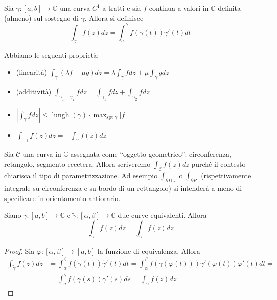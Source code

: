 \begin{definition}
    Sia \(\gamma : [a,b] \to \mathbb{C}\) una curva \(C^{1}\) a tratti e sia
    \(f\) continua a valori in \(\mathbb{C}\) definita (almeno) sul sostegno di
    \(\gamma\). Allora si definisce
    \[
        \int_{\gamma} f(z) dz = \int_{a}^{b} f(\gamma(t)) \gamma'(t) dt
    \]
\end{definition}
Abbiamo le seguenti proprietà:
\begin{itemize}[label = --]
    \item (linearità) \(\displaystyle \int_{\gamma} \left( \lambda f + \mu g
        \right) dz = \lambda \int_{\gamma} f dz + \mu \int_{\gamma} g dz\)
    \item (additività) \(\displaystyle \int_{\gamma_1 + \gamma_2} f dz =
        \int_{\gamma_1} f dz + \int_{\gamma_2} f dz\)
    \item \(\displaystyle \left| \int_{\gamma} f dz \right| \le \text{ lungh
        }(\gamma) \cdot \max_{\text{spt } \gamma } |f|  \) 
    \item \(\displaystyle \int_{-\gamma} f(z) dz = - \int_{\gamma} f(z)dz\) 
\end{itemize}

Sia \(\mathcal{C}\) una curva in \(\mathbb{C}\) assegnata come ``oggetto
geometrico'': circonferenza, retangolo, segmento eccetera. Allora scriveremo
\(
    \int_{\mathcal{C}} f(z) dz
\)
purché il contesto chiarisca il tipo di parametrizzazione. Ad esempio
\(
    \int_{\partial D_R} 
\) o \(
    \int_{\partial R}
\) (rispettivamente integrale su circonferenza e su bordo di un rettangolo) si intenderà a meno di specificare in orientamento antiorario.

\begin{proposition}
    Siano \(\gamma : [a,b] \to \mathbb{C}\) e \(\tilde{\gamma} : [\alpha, \beta]
    \to \mathbb{C}\) due curve equivalenti. Allora
    \[
        \int_{\gamma} f(z) dz = \int_{\tilde{\gamma}} f(z) dz
    \]
\end{proposition}
\begin{proof}
    Sia \(\varphi : [\alpha, \beta] \to [a,b]\) la funzione di equivalenza. Allora
    \begin{align*}
        \int_{\tilde{\gamma}} f(z) dz &= \int_{\alpha}^{\beta} f(\tilde{\gamma}(t))
        \tilde{\gamma}'(t) dt = \int_{\alpha}^{\beta} f(\gamma(\varphi(t)))
        \gamma'(\varphi(t)) \varphi'(t) dt = \\&= \int_{a}^{b} f(\gamma(s)) \gamma'(s)
        ds = \int_{\gamma} f(z) dz
    \end{align*}
\end{proof}

